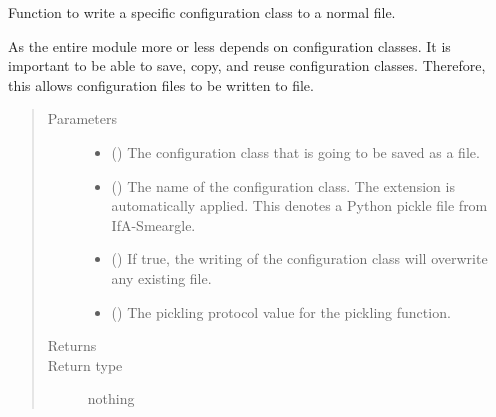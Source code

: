 \documentclass[letterpaper,10pt,english]{sphinxmanual}
\begin{document}
\begin{fulllineitems}
\label{\detokenize{python_docstrings/IfA_Smeargle.yankee.yankee_functions:IfA_Smeargle.yankee.yankee_functions.write_config_file}}
Function to write a specific configuration class to a normal file.

As the entire module more or less depends on configuration classes. It
is important to be able to save, copy, and reuse configuration classes.
Therefore, this allows configuration files to be written to file.
\begin{quote}\begin{description}
\item[{Parameters}] \leavevmode\begin{itemize}
\item {} 
 () \textendash{} The configuration class that is going to be saved as a file.

\item {} 
 () \textendash{} The name of the configuration class. The extension 
is automatically applied. This denotes a Python pickle file from
IfA-Smeargle.

\item {} 
 () \textendash{} If true, the writing of the configuration class will overwrite any
existing file.

\item {} 
 () \textendash{} The pickling protocol value for the pickling function.

\end{itemize}

\item[{Returns}] \leavevmode


\item[{Return type}] \leavevmode
nothing

\end{description}\end{quote}

\end{fulllineitems}
\end{document}
